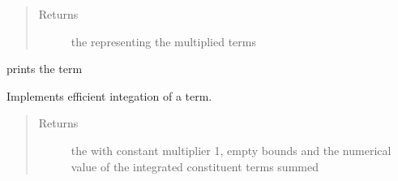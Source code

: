 \documentclass[letterpaper,10pt,english,openany,oneside]{sphinxmanual}
\begin{document}
\begin{fulllineitems}
\begin{fulllineitems}
\begin{quote}
\begin{description}
\item[{Returns}] \leavevmode
the {\hyperref[\detokenize{index:term.Term}]{}} representing the multiplied terms

\end{description}\end{quote}

\end{fulllineitems}


\begin{fulllineitems}
\label{\detokenize{index:term.Term.__str__}}
prints the term

\end{fulllineitems}


\begin{fulllineitems}
\label{\detokenize{index:term.Term.integrate}}
Implements efficient integation of a term.
\begin{quote}\begin{description}
\item[{Returns}] \leavevmode
the {\hyperref[\detokenize{index:term.Term}]{}} with constant multiplier 1, empty bounds and the numerical value of the integrated constituent terms summed

\end{description}\end{quote}

\end{fulllineitems}


\end{fulllineitems}

\end{document}
